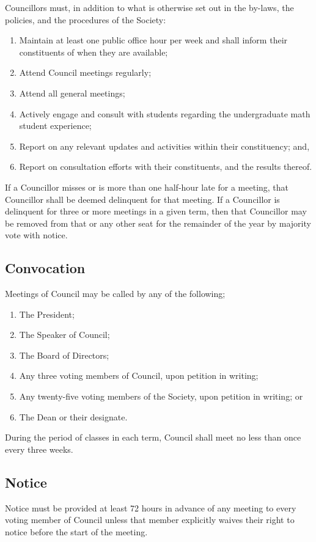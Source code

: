 Councillors must, in addition to what is otherwise set out in the by-laws,
the policies, and the procedures of the Society:
\begin{enumerate}
    \item Maintain at least one public office hour per week and shall inform
        their constituents of when they are available; 
    \item Attend Council meetings regularly; 
    \item Attend all general meetings;
    \item Actively engage and consult with students regarding the undergraduate
        math student experience;
    \item Report on any relevant updates and activities within their
        constituency; and,
    \item Report on consultation efforts with their constituents, and the
        results thereof.
\end{enumerate}

If a Councillor misses or is more than one half-hour late for a meeting, that
Councillor shall be deemed delinquent for that meeting. If a Councillor is
delinquent for three or more meetings in a given term, then that Councillor may
be removed from that or any other seat for the remainder of the year by
majority vote with notice.

\subsection{Convocation}
Meetings of Council may be called by any of the following;
\begin{enumerate}
  \item The President;
  \item The Speaker of Council;
  \item The Board of Directors;
  \item Any three voting members of Council, upon petition in writing;
  \item Any twenty-five voting members of the Society, upon petition in writing;
    or
  \item The Dean or their designate.
\end{enumerate}

During the period of classes in each term, Council shall meet no less
than once every three weeks.

\subsection{Notice}
Notice must be provided at least 72 hours in advance of any meeting to every
voting member of Council unless that member explicitly waives their
right to notice before the start of the meeting.

